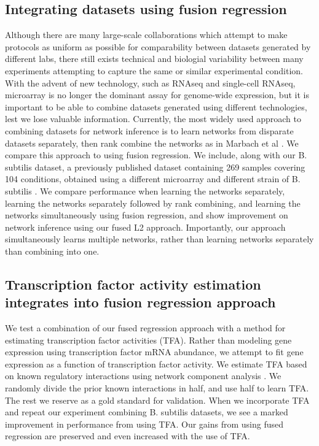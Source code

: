 \documentclass[11pt]{article}
\begin{document}
\subsection{Integrating datasets using fusion regression}
Although there are many large-scale collaborations which attempt to make protocols as uniform as possible for comparability between datasets generated by different labs, there still exists technical and biologial variability between many experiments attempting to capture the same or similar experimental condition. With the advent of new technology, such as RNAseq and single-cell RNAseq, microarray is no longer the dominant assay for genome-wide expression, but it is important to be able to combine datasets generated using different technologies, lest we lose valuable information. Currently, the most widely used approach to combining datasets for network inference is to learn networks from disparate datasets separately, then rank combine the networks as in Marbach et al \cite{marbach_revealing_2010}. We compare this approach to using fusion regression. We include, along with our B. subtilis dataset, a previously published dataset containing 269 samples covering 104 conditions, obtained using a different microarray and different strain of B. subtilis \cite{nicolas2012condition}. We compare performance when learning the networks separately, learning the networks separately followed by rank combining, and learning the networks simultaneously using fusion regression, and show improvement on network inference using our fused L2 approach. Importantly, our approach simultaneously learns multiple networks, rather than learning networks separately than combining into one. 

\subsection{Transcription factor activity estimation integrates into fusion regression approach}
We test a combination of our fused regression approach with a method for estimating transcription factor activities (TFA). Rather than modeling gene expression using transcription factor mRNA abundance, we attempt to fit gene expression as a function of transcription factor activity. We estimate TFA based on known regulatory interactions using network component analysis \cite{liao2003network}. We randomly divide the prior known interactions in half, and use half to learn TFA. The rest we reserve as a gold standard for validation. When we incorporate TFA and repeat our experiment combining B. subtilis datasets, we see a marked improvement in performance from using TFA. Our gains from using fused regression are preserved and even increased with the use of TFA. 
\end{document}
